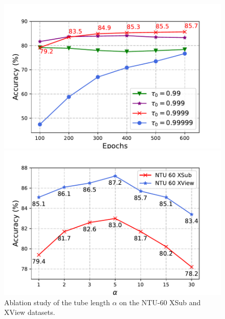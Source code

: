 \begin{figure}[tb]
  \begin{minipage}[b]{0.48\linewidth}
    \centering
    \includegraphics[width=0.80\linewidth]{figures/ema_ablation.pdf}
    \caption{
      Ablation study of EMA parameter $\tau_{0}$ on the NTU-60 XSub dataset
      under linear protocol.
      }
    \label{fig:ema_ablation}
  \end{minipage}
  \hfill
  \begin{minipage}[b]{0.48\linewidth}
    \centering
    \includegraphics[width=0.80\linewidth]{figures/alpha_ablation.pdf}
    \caption{
      Ablation study of the tube length $\alpha$ on the NTU-60 XSub and XView datasets.
      }
    \label{fig:alpha_ablation}
  \end{minipage}
  \vspace{-14pt}
\end{figure}

